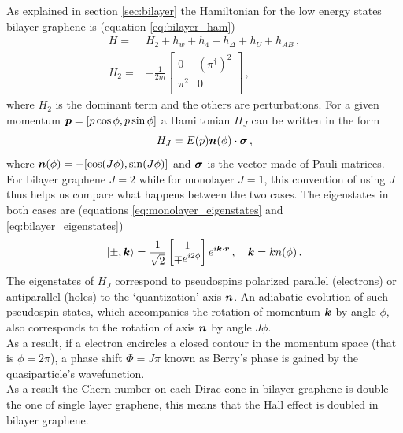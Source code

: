 As explained in section \ref{sec:bilayer} the Hamiltonian for the low energy states bilayer graphene is (equation \ref{eq:bilayer_ham})
\begin{equation}
\begin{split}
    H=&H_2+h_w+h_4+h_\Delta+h_U+h_{AB}\,,\\
    H_2=&-\frac1 {2m}\begin{bmatrix}
        0 & (\pi^\dag)^2\\
        \pi^2 &0\\
    \end{bmatrix}\,,
\end{split}
\end{equation}
where $H_2$ is the dominant term and the others are perturbations.
For a given momentum $\boldsymbol{p}=[p\cos\phi,p\sin\phi]$ a Hamiltonian $H_J$ can be written in the form
\begin{equation}
    H_J=E(p)\boldsymbol{n}(\phi)\cdot \boldsymbol{\sigma}\,,
\end{equation}
where $\boldsymbol{n}(\phi)=-[\cos(J\phi),\sin(J\phi)]$ and $\boldsymbol{\sigma}$ is the vector made of Pauli matrices. For bilayer graphene $J=2$ while for monolayer $J=1$, this convention of using $J$ thus helps us compare what happens between the two cases.
The eigenstates in both cases are (equations \ref{eq:monolayer_eigenstates} and \ref{eq:bilayer_eigenstates})
 \begin{equation}
    \ket{\pm,\boldsymbol{k}}=
    \frac 1{\sqrt 2}
    \begin{bmatrix}
        1\\
        \mp e^{i2\phi}
    \end{bmatrix}
    e^{i\boldsymbol{k}\cdot \boldsymbol{r}}\,,\quad
    \boldsymbol{k}=kn(\phi)\,.
\end{equation}
The eigenstates of $H_J$ correspond to pseudospins polarized parallel (electrons) or antiparallel (holes) to the ‘quantization’ axis $\boldsymbol{n}$. An adiabatic evolution of such pseudospin states, which accompanies the rotation of momentum $\boldsymbol{k}$ by angle $\phi$, also corresponds to the rotation of axis $\boldsymbol{n}$ by angle $J\phi$.\\
As a result, if a electron encircles a closed contour in the momentum space (that is $\phi = 2\pi$), a phase shift $\Phi = J \pi$ known as Berry’s phase is gained by the quasiparticle’s wavefunction.\\
As a result the Chern number on each Dirac cone in bilayer graphene is double the one of single layer graphene, this means that the Hall effect is doubled in bilayer graphene.

